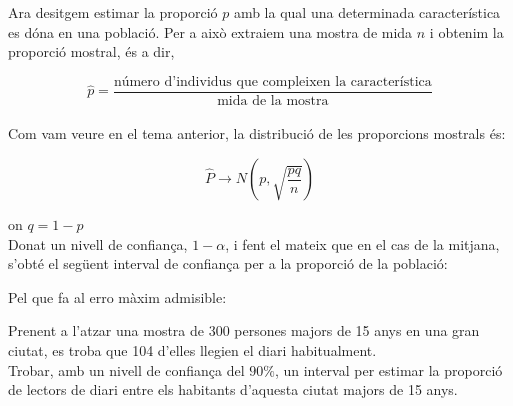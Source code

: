 \documentclass[12pt]{article}
\begin{document}
\begin{concept} [title= Concepte] \noindent
Ara desitgem estimar la proporció $p$ amb la qual una determinada característica es dóna en una població. Per a això extraiem una mostra de mida $n$ i obtenim la proporció mostral, és a dir,

$$
\hat{p}=\frac{\text{número d'individus que compleixen la característica}}{\text{mida de la mostra}}
$$\\

Com vam veure en el tema anterior, la distribució de les proporcions mostrals és:

$$
\hat{P} \rightarrow N\left(p, \sqrt{\frac{p q}{n}}\right)
$$

on $q=1-p$\\

Donat un nivell de confiança, $1-\alpha$, i fent el mateix que en el cas de la mitjana, s'obté el següent interval de confiança per a la proporció de la població:

\begin{center}
\end{center}

Pel que fa al erro màxim admisible:

\begin{center}
\end{center}
\end{concept}

\begin{exemple} [title=Exemple 1] \noindent
Prenent a l'atzar una mostra de 300 persones majors de 15 anys en una gran ciutat, es troba que 104 d'elles llegien el diari habitualment. \\

Trobar, amb un nivell de confiança del $90 \%$, un interval per estimar la proporció de lectors de diari entre els habitants d'aquesta ciutat majors de 15 anys.\\
    
\end{exemple}
\end{document}
